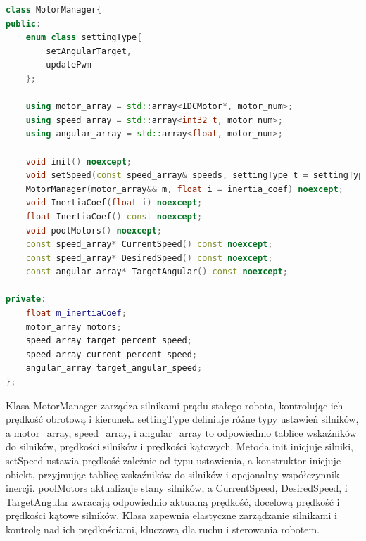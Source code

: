 \documentclass[12pt,twoside]{article}
\begin{document}
\begin{lstlisting}[language=C++, caption={Klasa MotorManager}, label={lst:MotorManager}]
class MotorManager{
public:
    enum class settingType{
        setAngularTarget,
        updatePwm
    };

    using motor_array = std::array<IDCMotor*, motor_num>;
    using speed_array = std::array<int32_t, motor_num>; 
    using angular_array = std::array<float, motor_num>;

    void init() noexcept;
    void setSpeed(const speed_array& speeds, settingType t = settingType::updatePwm) noexcept;
    MotorManager(motor_array&& m, float i = inertia_coef) noexcept;
    void InertiaCoef(float i) noexcept;
    float InertiaCoef() const noexcept;
    void poolMotors() noexcept;
    const speed_array* CurrentSpeed() const noexcept;
    const speed_array* DesiredSpeed() const noexcept;
    const angular_array* TargetAngular() const noexcept;

private:
    float m_inertiaCoef;
    motor_array motors;
    speed_array target_percent_speed;
    speed_array current_percent_speed;
    angular_array target_angular_speed;
};
\end{lstlisting}

Klasa MotorManager zarządza silnikami prądu stałego robota, kontrolując ich prędkość obrotową i kierunek. settingType definiuje różne typy ustawień silników, a motor\_array, speed\_array, i angular\_array to odpowiednio tablice wskaźników do silników, prędkości silników i prędkości kątowych. Metoda init inicjuje silniki, setSpeed ustawia prędkość zależnie od typu ustawienia, a konstruktor inicjuje obiekt, przyjmując tablicę wskaźników do silników i opcjonalny współczynnik inercji. poolMotors aktualizuje stany silników, a CurrentSpeed, DesiredSpeed, i TargetAngular zwracają odpowiednio aktualną prędkość, docelową prędkość i prędkości kątowe silników. Klasa zapewnia elastyczne zarządzanie silnikami i kontrolę nad ich prędkościami, kluczową dla ruchu i sterowania robotem.
\end{document}
